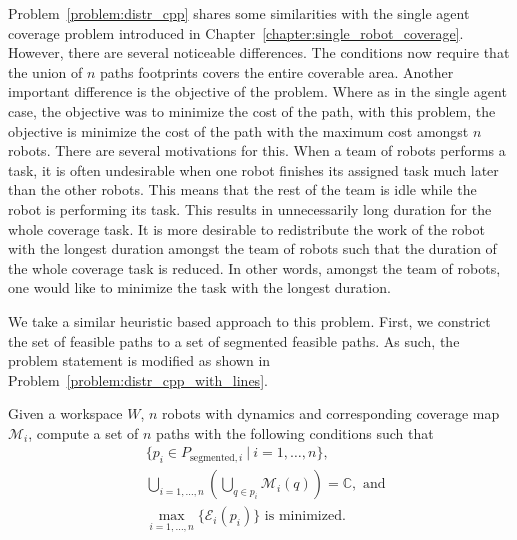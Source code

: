 \documentclass[../main.tex]{subfiles}
\begin{document}
Problem~\ref{problem:distr_cpp} shares some similarities with the single agent coverage problem introduced in Chapter~\ref{chapter:single_robot_coverage}. However, there are several noticeable differences. %
The conditions now require that the union of $n$ paths footprints covers the entire coverable area. Another important difference is the objective of the problem. Where as in the single agent case, the objective was to minimize the cost of the path, with this problem, the objective is minimize the cost of the path with the maximum cost amongst $n$ robots. There are several motivations for this. When a team of robots performs a task, it is often undesirable when one robot finishes its assigned task much later than the other robots. This means that the rest of the team is idle while the robot is performing its task. This results in unnecessarily long duration for the whole coverage task. It is more desirable to redistribute the work of the robot with the longest duration amongst the team of robots such that the duration of the whole coverage task is reduced. In other words, amongst the team of robots, one would like to minimize the task with the longest duration.

We take a similar heuristic based approach to this problem. First, we constrict the set of feasible paths to a set of segmented feasible paths. As such, the problem statement is modified as shown in Problem~\ref{problem:distr_cpp_with_lines}.

\begin{problem}
\label{problem:distr_cpp_with_lines}
	Given a workspace $W$, $n$ robots with dynamics and corresponding coverage map $\mathcal{M}_i$, compute a set of $n$ paths with the following conditions
such that
	\begin{equation}
	\begin{aligned}
		& \{p_i\in P_{\text{segmented},i}\ |\ i=1,\dots,n\},\\
		& \bigcup_{i=1,\dots,n}(\bigcup_{q\in p_i}\mathcal{M}_i(q))=\mathbb{C},\text{ and}\\
		& \max_{i=1,\ldots,n}\{\mathcal{E}_i(p_i)\}\text{ is minimized.}
	\end{aligned}
	\end{equation}
\end{problem}
\end{document}
